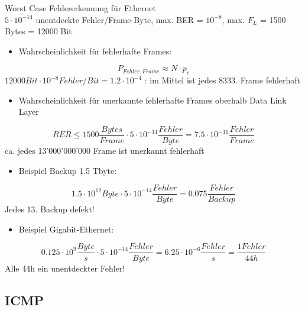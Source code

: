 \begin{KR}{Worst Case Fehlererkennung für Ethernet}\\
    $5 \cdot 10^{-14}$ unentdeckte Fehler/Frame-Byte, max. BER = $10^{-8}$, max. $F_L$ = 1500 Bytes = 12000 Bit
    \begin{itemize}
        \item Wahrscheinlichkeit für fehlerhafte Frames:
    \end{itemize}
    $$P_{Fehler, Frame} \approx N \cdot p_e$$
    $12000 Bit \cdot 10^{-8} Fehler/Bit = 1.2 \cdot 10^{-4}$ : im Mittel ist jedes 8333. Frame fehlerhaft
    \begin{itemize}
        \item Wahrscheinlichkeit für unerkannte fehlerhafte Frames oberhalb Data Link Layer
    \end{itemize}
    $$RER \leq 1500 \frac{Bytes}{Frame} \cdot 5 \cdot 10^{-14} \frac{Fehler}{Byte} = 7.5 \cdot 10^{-11} \frac{Fehler}{Frame}$$
    ca. jedes 13'000'000'000 Frame ist unerkannt fehlerhaft
    \begin{itemize}
        \item Beispiel Backup 1.5 Tbyte:
    \end{itemize}
    $$1.5 \cdot 10^{12} Byte \cdot 5 \cdot 10^{-14} \frac{Fehler}{Byte} = 0.075 \frac{Fehler}{Backup}$$
    Jedes 13. Backup defekt!
    \begin{itemize}
        \item Beispiel Gigabit-Ethernet:
    \end{itemize}
    $$0.125 \cdot 10^9 \frac{Byte}{s} \cdot 5 \cdot 10^{-14} \frac{Fehler}{Byte} = 6.25 \cdot 10^{-6} \frac{Fehler}{s} = \frac{1 Fehler}{44h}$$
    Alle 44h ein unentdeckter Fehler!
\end{KR}

\subsection*{ICMP}

